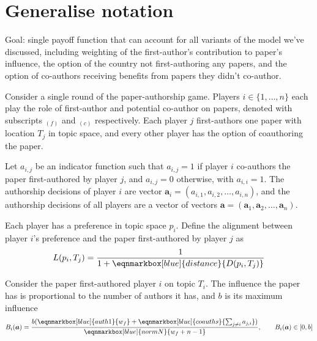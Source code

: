 \documentclass[12pt]{article}
\begin{document}
\tableofcontents

\clearpage
\section{Generalise notation}

Goal: single payoff function that can account for all variants of the model
we've discussed, 
including weighting of the first-author's contribution to paper's influence, 
the option of the country not first-authoring any papers,
and the option of co-authors receiving benefits from papers they didn't
co-author.

Consider a single round of the paper-authorship game.
Players $i \in \{ 1, \ldots, n \}$
each play the role of first-author and potential co-author on papers, 
denoted with subscripts $_{(f)}$ and $_{(c)}$ respectively.
Each player $j$ first-authors one paper with location $T_j$ in topic space,
and every other player has the option of coauthoring the paper.

Let $a_{i,j}$ be an indicator function
such that $a_{i,j} = 1$ if player $i$ co-authors the paper first-authored by player $j$,
and $a_{i,j} = 0$ otherwise, with $a_{i,i}=1$.
The authorship decisions of player $i$ are vector 
$\boldsymbol{a}_i = (a_{i,1}, a_{i,2}, \ldots, a_{i,n})$,
and the authorship decisions of all players are a vector of vectors 
$\boldsymbol{a} = (\boldsymbol{a}_1, \boldsymbol{a}_2, \ldots, \boldsymbol{a}_{n})$.

Each player has a preference in topic space $p_i$.
Define the alignment between player $i$'s preference
and the paper first-authored by player $j$ as
\begin{equation}
    L(p_i, T_j) = \frac{1}{
        1 + \eqnmarkbox[blue]{distance}{D(p_i, T_j)}
    }
\end{equation}


\clearpage
Consider the paper first-authored player $i$ on topic $T_i$.
The influence the paper has is 
proportional to the number of authors it has,
and $b$ is its maximum influence
\vspace{2em}
\begin{equation}
    B_i(\boldsymbol{a}) = \frac{
        b (\eqnmarkbox[blue]{auth1}{w_f} + \eqnmarkbox[blue]{coauths}{\sum_{j \neq i} a_{j,i}})
    }{ \eqnmarkbox[blue]{normN}{w_f + n - 1} },
    \qquad B_i(\boldsymbol{a}) \in \left[ 0, b \right]
\end{equation}
\end{document}
